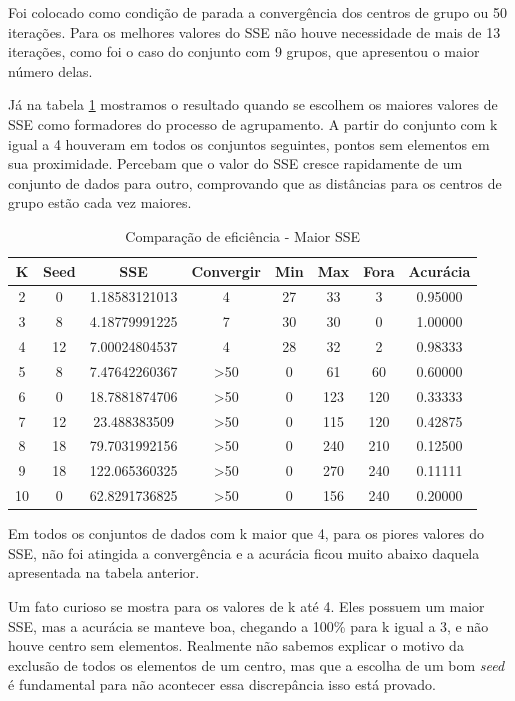 \documentclass[12pt, a4paper]{article}
\begin{document}
Foi colocado como condição de parada a convergência dos centros de grupo ou 50 iterações. Para os melhores valores do SSE não houve necessidade de mais de 13 iterações, como foi o caso do conjunto com 9 grupos, que apresentou o maior número delas.

Já na tabela \ref{tabPior} mostramos o resultado quando se escolhem os maiores valores de SSE como formadores do processo de agrupamento. A partir do conjunto com k igual a 4  houveram em todos os conjuntos seguintes, pontos sem elementos em sua proximidade. Percebam que o valor do SSE cresce rapidamente de um conjunto de dados para outro, comprovando que as distâncias para os centros de grupo estão cada vez maiores.

\begin{table}[!ht]
	\centering
	\caption{Comparação de eficiência - Maior SSE}	
	\label{tabPior}
	\begin{tabular}{|c|c|c|c|c|c|c|c|}
	\hline
	K & Seed & SSE & Convergir & Min & Max & Fora & Acurácia\\
	\hline
	2 & 0 & 1.18583121013 & 4 & 27 & 33 & 3 & 0.95000 \\
	\hline
	3 & 8 & 4.18779991225 & 7 & 30 & 30 & 0 & 1.00000 \\
	\hline
	4 & 12 & 7.00024804537 & 4 & 28 & 32 & 2 & 0.98333\\
	\hline
	5 & 8 & 7.47642260367 & >50 & 0 & 61 & 60 & 0.60000\\
	\hline
	6 & 0 & 18.7881874706 & >50 & 0 & 123 & 120 & 0.33333\\
	\hline
	7 & 12 & 23.488383509 & >50 & 0 & 115 & 120 & 0.42875\\
	\hline
	8 & 18 & 79.7031992156 & >50 & 0 & 240 & 210 & 0.12500 \\
	\hline
	9 & 18 & 122.065360325 & >50 & 0 & 270 & 240 & 0.11111\\
	\hline
	10 & 0 & 62.8291736825 & >50 & 0 & 156 & 240 & 0.20000\\
	\hline
	\end{tabular}
\end{table}

Em todos os conjuntos de dados com k maior que 4, para os piores valores do SSE, não foi atingida a convergência e a acurácia ficou muito abaixo daquela apresentada na tabela anterior.

Um fato curioso se mostra para os valores de k até 4. Eles possuem um maior SSE, mas a acurácia se manteve boa, chegando a 100\% para k igual a 3, e não houve centro sem elementos. Realmente não sabemos explicar o motivo da exclusão de todos os elementos de um centro, mas que a escolha de um bom \emph{seed} é fundamental para não acontecer essa discrepância isso está provado.
\end{document}
